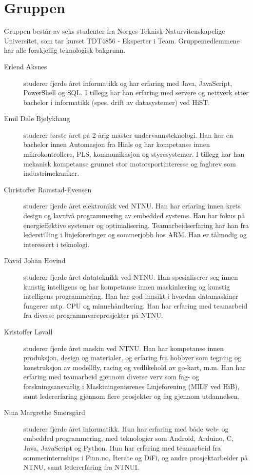 \section{Gruppen}
Gruppen består av seks studenter fra Norges Teknisk-Naturvitenskapelige
Universitet, som tar kurset TDT4856 - Eksperter i Team. Gruppemedlemmene
har alle forskjellig teknologisk bakgrunn.
\begin{description} 

	\item[Erlend Aksnes] studerer fjerde året informatikk og har erfaring med Java, JavaScript, PowerShell og SQL. I tillegg har han erfaring med servere og nettverk etter bachelor i informatikk (spes. drift av datasystemer) ved HiST. 

	\item[Emil Dale Bjølykhaug] studerer første året på 2-årig master undervannsteknologi. 
Han har en bachelor innen Automasjon fra Hials og har kompetanse innen mikrokontrollere, PLS, 
kommunikasjon og styresystemer. I tillegg har han mekanisk kompetanse grunnet stor 
motorsportinteresse og fagbrev som industrimekaniker.

	\item[Christoffer Ramstad-Evensen] studerer fjerde
  året elektronikk ved NTNU. Han har erfaring innen krets design
  og lavnivå programmering av embedded systems. Han har fokus på energieffektive
  systemer og optimalisering. Teamarbeidserfaring har han fra lederstilling i
  linjeforeringer og sommerjobb hos ARM. Han er tålmodig og interessert i
  teknologi.
	\item[David Johän Hovind] studerer fjerde året datateknikk ved NTNU. 
	Han spesialiserer seg innen kunstig intelligens og har kompetanse innen maskinlæring
	og kunstig intelligens programmering. Han har god innsikt i hvordan datamaskiner fungerer
	mtp. CPU og minnehåndtering. Han har erfaring med teamarbeid fra diverse 
	programmvareprosjekter på NTNU.
	\item[Kristoffer Løvall] studerer fjerde året maskin ved NTNU. 
	Han har kompetanse innen produksjon, design og materialer, og erfaring
	fra hobbyer som tegning og konstruksjon av modellfly, racing og vedlikehold
	av go-kart, m.m. Han har erfaring med teamarbeid gjennom diverse verv som fag-
	og forskningsansvarlig i Maskiningeniørenes Linjeforening (MILF ved HiB), samt
	ledererfaring gjennom flere prosjekter og fag gjennom utdannelsen.
	
	\item[Nina Margrethe Smørsgård] studerer fjerde året
	informatikk. Hun har erfaring med både web- og embedded programmering, med
	teknologier som Android, Arduino, C, Java, JavaScript og Python. Hun har
	erfaring med teamarbeid fra sommerinternships i Finn.no, Iterate og DiFi,
	og andre prosjektarbeider på NTNU, samt ledererfaring fra NTNUI.
\end{description}